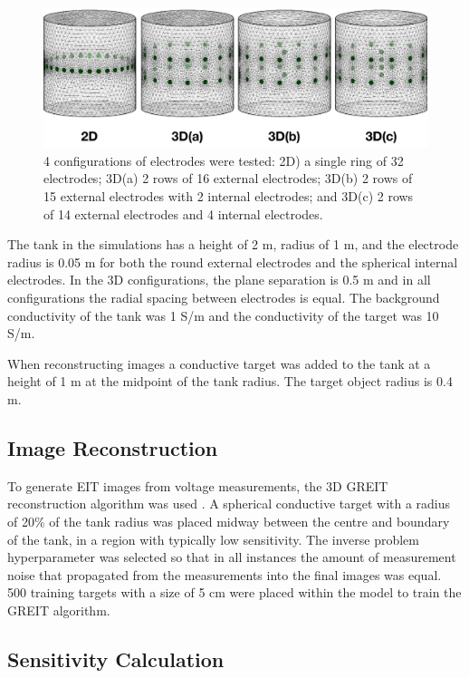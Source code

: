 \begin{figure}[H]
\centering
\includegraphics[width=\textwidth]{chapter6-internal_electrodes/imgs/FEM_Comparison.pdf}
\caption[Internal electrode configurations]{4 configurations of electrodes were tested: 2D) a single ring of 32 electrodes; 
	3D(a) 2 rows of 16 external electrodes; 3D(b) 2 rows of 15 external electrodes with 2 internal electrodes; and 3D(c) 2 rows 
of 14 external electrodes and 4 internal electrodes.}
\label{fig:tank_FEM}
\end{figure}

The tank in the simulations has a height of 2 m, radius of 1 m, and the electrode radius
is 0.05 m for both the round external electrodes and the spherical internal electrodes.
In the 3D configurations, the plane separation is 0.5 m and in all configurations the radial
spacing between electrodes is equal.
The background conductivity of the tank was 1 S/m and the conductivity of the target was
10 S/m.

When reconstructing images a conductive target was added to the tank
at a height of 1 m at the midpoint of the tank radius. The target
object radius is 0.4 m.

\subsection{Image Reconstruction}

To generate EIT images from voltage measurements, the 3D GREIT
reconstruction algorithm
was used \parencite{grychtol_3d_2016}. A spherical
conductive target with a radius of 20\% of the tank radius
was placed midway between the centre and boundary
of the tank, in a region with typically low sensitivity.
The inverse problem hyperparameter
was selected so that in all instances the amount of measurement
noise that propagated from the measurements into the final images
was equal. 500 training targets with a size of 5 cm were placed within the model to train the GREIT 
algorithm. 

\subsection{Sensitivity Calculation}

